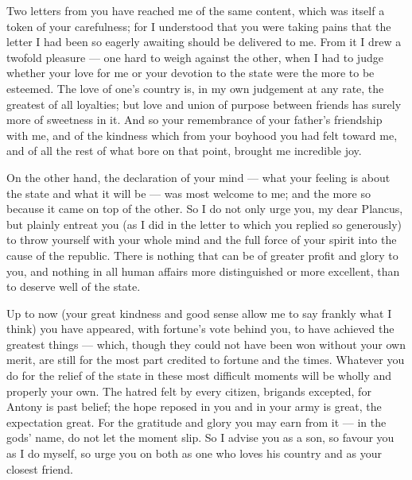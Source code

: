 

 Two letters from you have reached me of the same content, which was itself a token of your carefulness; for I understood that you were taking pains that the letter I had been so eagerly awaiting should be delivered to me. From it I drew a twofold pleasure --- one hard to weigh against the other, when I had to judge whether your love for me or your devotion to the state were the more to be esteemed. The love of one's country is, in my own judgement at any rate, the greatest of all loyalties; but love and union of purpose between friends has surely more of sweetness in it. And so your remembrance of your father's friendship with me, and of the kindness which from your boyhood you had felt toward me, and of all the rest of what bore on that point, brought me incredible joy.

 On the other hand, the declaration of your mind --- what your feeling is about the state and what it will be --- was most welcome to me; and the more so because it came on top of the other. So I do not only urge you, my dear Plancus, but plainly entreat you (as I did in the letter to which you replied so generously) to throw yourself with your whole mind and the full force of your spirit into the cause of the republic. There is nothing that can be of greater profit and glory to you, and nothing in all human affairs more distinguished or more excellent, than to deserve well of the state.

 Up to now (your great kindness and good sense allow me to say frankly what I think) you have appeared, with fortune's vote behind you, to have achieved the greatest things --- which, though they could not have been won without your own merit, are still for the most part credited to fortune and the times. Whatever you do for the relief of the state in these most difficult moments will be wholly and properly your own. The hatred felt by every citizen, brigands excepted, for Antony is past belief; the hope reposed in you and in your army is great, the expectation great. For the gratitude and glory you may earn from it --- in the gods' name, do not let the moment slip. So I advise you as a son, so favour you as I do myself, so urge you on both as one who loves his country and as your closest friend.
